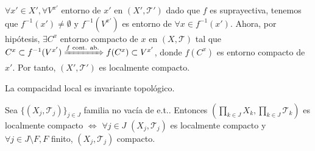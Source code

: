 \begin{dem}
  $\forall x' \in X', \forall V^{x'}$ entorno de $x'$ en $( X', \mathcal{T}' )$ dado que $f$ es suprayectiva, tenemos que $f^{-1}(x') \neq \emptyset$ y $f^{-1}(V^{x'})$ es entorno de $\forall x \in f^{-1}(x')$. Ahora, por hipótesis, $\exists C^{x}$ entorno compacto de $x$ en $( X, \mathcal{T} )$ tal que $C^{x} \subset f^{-1}(V^{x'}) \xRightarrow[]{ f \text{ cont. ab.} } f(C^{x}) \subset V^{x'}$, donde $f(C^{x})$ es entorno compacto de $x'$. Por tanto, $( X', \mathcal{T}' )$ es localmente compacto.
\end{dem}

\begin{cor}
  La compacidad local es invariante topológico.
\end{cor}

\begin{prop}
  Sea $\{ ( X_{j}, \mathcal{T}_{j} ) \}_{j \in J}$ familia no vacía de e.t.. Entonces $( \prod_{k \in J} X_{k}, \prod_{k \in J} \mathcal{T}_{k})$ es localmente compacto $\Leftrightarrow$ $\forall j \in J$ $( X_{j}, \mathcal{T}_{j} )$ es localmente compacto  y $\forall j \in J \setminus F, F$ finito, $( X_{j}, \mathcal{T}_{j} )$ compacto.
\end{prop}


